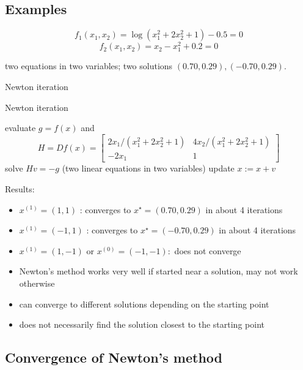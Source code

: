\subsection{Examples}

\begin{example}
    $$ f_{1}\left(x_{1}, x_{2}\right)=\log \left(x_{1}^{2}+2 x_{2}^{2}+1\right)-0.5=0 $$
$$ f_{2}\left(x_{1}, x_{2}\right)=x_{2}-x_{1}^{2}+0.2=0 $$

two equations in two variables; two solutions $ (0.70,0.29),(-0.70,0.29) $.

Newton iteration

\begin{algorithm}[htbp]
    \caption{Newton iteration}
    evaluate $ g=f(x) $ and
$$
H=D f(x)=\left[\begin{array}{cc}
2 x_{1} /\left(x_{1}^{2}+2 x_{2}^{2}+1\right) & 4 x_{2} /\left(x_{1}^{2}+2 x_{2}^{2}+1\right) \\
-2 x_{1} & 1
\end{array}\right]
$$\;
solve $ H v=-g $ (two linear equations in two variables)\;
update $ x:=x+v $\;
\end{algorithm}


Results: 

\begin{itemize}
    \item $ x^{(1)}=(1,1) $ : converges to $ x^{\star}=(0.70,0.29) $ in about 4 iterations
    \item $ x^{(1)}=(-1,1) $ : converges to $ x^{\star}=(-0.70,0.29) $ in about 4 iterations
    \item $ x^{(1)}=(1,-1) $ or $ x^{(0)}=(-1,-1): $ does not converge
\end{itemize}

\end{example}

\begin{itemize}
    \item Newton's method works very well if started near a solution, may not work otherwise
    \item can converge to different solutions depending on the starting point
    \item does not necessarily find the solution closest to the starting point
\end{itemize}

\subsection{Convergence of Newton's method}

